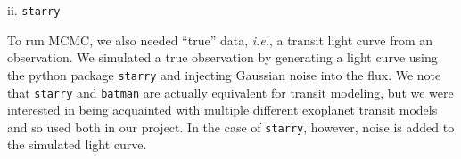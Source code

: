 \documentclass[linenumbers]{aastex631}
\begin{document}
\par \vspace{.1cm}
ii. {\tt\string starry}
\par \vspace{.1cm}
To run MCMC, we also needed “true” data, \textit{i.e.}, a transit light curve from an observation. We simulated a true observation by generating a light curve using the python package {\tt\string starry} \citep{starry} and injecting Gaussian noise into the flux. We note that {\tt\string starry} and {\tt\string batman} are actually equivalent for transit modeling, but we were interested in being acquainted with multiple different exoplanet transit models and so used both in our project. In the case of {\tt\string starry}, however, noise is added to the simulated light curve.


\end{document}
